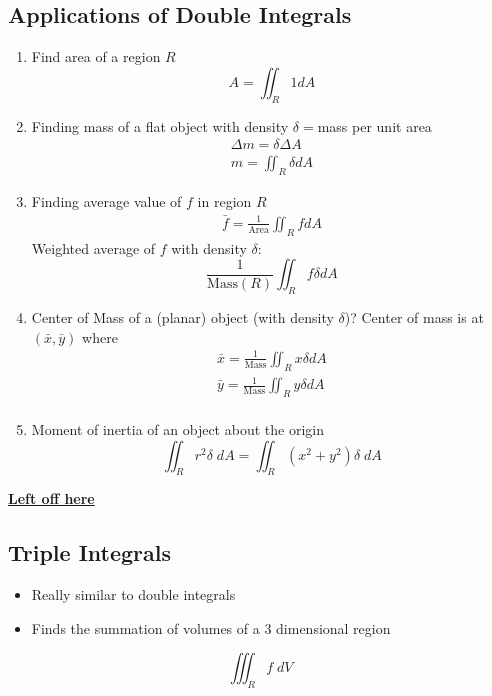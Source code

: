 \documentclass[../main.tex]{subfiles}
\begin{document}
\subsection{Applications of Double Integrals}
\begin{enumerate}
	\item Find area of a region $R$
	\begin{equation*}
		A = \iint_R 1 dA 
	\end{equation*}
	\item Finding mass of a flat object with density $\delta = $mass per unit area
	\begin{align*}
		\Delta m = \delta \Delta A \\
		m = \iint_R \delta dA
	\end{align*}
	\item Finding average value of $f$ in region $R$
	\begin{align*}
		\bar f = \frac1{\text{Area}} \iint_R f dA
	\end{align*}
	Weighted average of $f$ with density $\delta$: 
	\begin{equation*}
		\frac1{\text{Mass}(R)} \iint_R f \delta dA
	\end{equation*}
	\item Center of Mass of a (planar) object (with density $\delta$)? \newline
		Center of mass is at $(\bar x, \bar y)$ where 
		\begin{align*}
			\bar x = \frac1{\text{Mass}} \iint_R x \delta dA \\
			\bar y = \frac1{\text{Mass}} \iint_R y \delta dA \\
		\end{align*}
	\item Moment of inertia of an object about the origin
		\begin{equation*}
			\iint_R r^2 \delta \; dA = \iint_R (x^2 + y^2) \delta \; dA
		\end{equation*}
\end{enumerate}

\href{https://youtu.be/60e4hdCi1D4?t=1308}{\bf Left off here}

\subsection{Triple Integrals}
\begin{itemize}
    \item Really similar to double integrals
    \item Finds the summation of volumes of a 3 dimensional region
\end{itemize}
\begin{equation*}
    \iiint_R f \; dV
\end{equation*}
\end{document}
